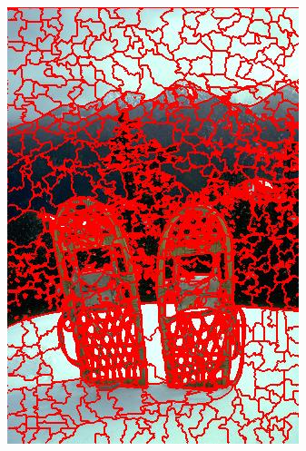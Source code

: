 \begin{figure}
{		\includegraphics[scale=\scalefivebsdtest]{pictures/bsd-test-4-qs}
	}
	\subfigure{
}
\end{figure}
